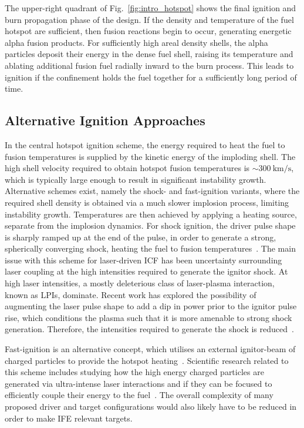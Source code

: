 The upper-right quadrant of Fig.~\ref{fig:intro_hotspot} shows the final ignition and burn propagation phase of the design.
If the density and temperature of the fuel hotspot are sufficient, then fusion reactions begin to occur, generating energetic alpha fusion products.
For sufficiently high areal density shells, the alpha particles deposit their energy in the dense fuel shell, raising its temperature and ablating additional fusion fuel radially inward to the burn process.
This leads to ignition if the confinement holds the fuel together for a sufficiently long period of time.

\subsection{Alternative Ignition Approaches}%
\label{sec:intro_icf_alt}

In the central hotspot ignition scheme, the energy required to heat the fuel to fusion temperatures is supplied by the kinetic energy of the imploding shell.
The high shell velocity required to obtain hotspot fusion temperatures is $\sim300\ \text{km/s}$, which is typically large enough to result in significant instability growth.
Alternative schemes exist, namely the shock- and fast-ignition variants, where the required shell density is obtained via a much slower implosion process, limiting instability growth.
Temperatures are then achieved by applying a heating source, separate from the implosion dynamics.
For shock ignition, the driver pulse shape is sharply ramped up at the end of the pulse, in order to generate a strong, spherically converging shock, heating the fuel to fusion temperatures~\cite{betti_shock_2007,perkins_shock_2009}.
The main issue with this scheme for laser-driven \ac{ICF} has been uncertainty surrounding laser coupling at the high intensities required to generate the ignitor shock.
At high laser intensities, a mostly deleterious class of laser-plasma interaction, known as \ac{LPIs}, dominate.
Recent work has explored the possibility of augmenting the laser pulse shape to add a dip in power prior to the ignitor pulse rise, which conditions the plasma such that it is more amenable to strong shock generation.
Therefore, the intensities required to generate the shock is reduced~\cite{scott_shockaugmented_2022}.

Fast-ignition is an alternative concept, which utilises an external ignitor-beam of charged particles to provide the hotspot heating~\cite{tabak_ignition_1994}.
Scientific research related to this scheme includes studying how the high energy charged particles are generated via ultra-intense laser interactions and if they can be focused to efficiently couple their energy to the fuel~\cite{jarrott_visualizing_2016,gong_direct_2019}.
The overall complexity of many proposed driver and target configurations would also likely have to be reduced in order to make \ac{IFE} relevant targets.

